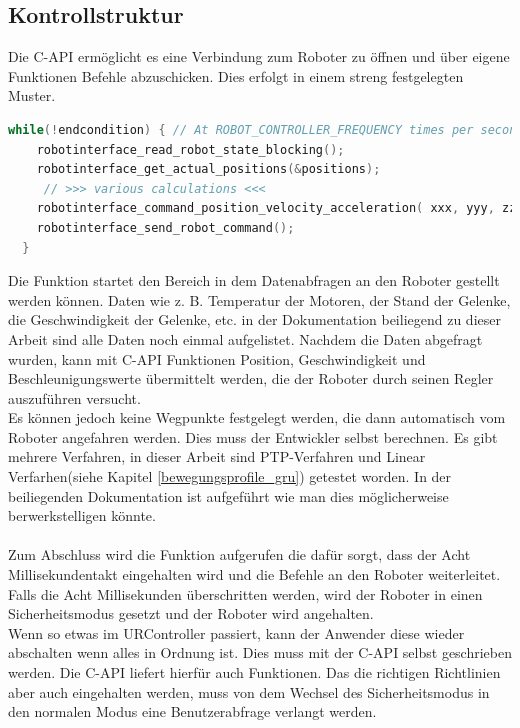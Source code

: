 \subsection{Kontrollstruktur}
\label{capi_control_loop_gru}	

Die C-\acs{API} ermöglicht es eine Verbindung zum Roboter zu öffnen und über eigene Funktionen Befehle abzuschicken. Dies erfolgt in einem streng festgelegten Muster.

\begin{lstlisting}[language=C,caption={Beispiel der Kontroll Struktur}, label=lst:robot_control_loop,captionpos=b]
  while(!endcondition) { // At ROBOT_CONTROLLER_FREQUENCY times per second
    robotinterface_read_robot_state_blocking();
    robotinterface_get_actual_positions(&positions);
     // >>> various calculations <<<
    robotinterface_command_position_velocity_acceleration( xxx, yyy, zzz);
    robotinterface_send_robot_command();
  }
\end{lstlisting}

Die Funktion  startet den Bereich in dem Datenabfragen an den Roboter gestellt werden können. Daten wie z. B. Temperatur der Motoren, der Stand der Gelenke, die Geschwindigkeit der Gelenke, etc. in der Dokumentation beiliegend zu dieser Arbeit sind alle Daten noch einmal aufgelistet. Nachdem die Daten abgefragt wurden, kann mit C-\acs{API} Funktionen Position, Geschwindigkeit und Beschleunigungswerte übermittelt werden, die der Roboter durch seinen Regler auszuführen versucht.\\
Es können jedoch keine Wegpunkte festgelegt werden, die dann automatisch vom Roboter angefahren werden. Dies muss der Entwickler selbst 
berechnen. 
Es gibt mehrere Verfahren, in dieser Arbeit sind \ac{PTP}-Verfahren und Linear Verfarhen(siehe Kapitel \ref{bewegungsprofile_gru}) getestet worden. In der beiliegenden Dokumentation ist aufgeführt wie man dies möglicherweise berwerkstelligen könnte.
\\\\
Zum Abschluss wird die Funktion  aufgerufen die dafür sorgt, dass der Acht Millisekundentakt eingehalten wird und die Befehle an den Roboter weiterleitet. Falls die Acht Millisekunden überschritten werden, wird der Roboter in einen Sicherheitsmodus gesetzt und der Roboter wird angehalten.
\\
Wenn so etwas im URController passiert, kann der Anwender diese wieder abschalten wenn alles in Ordnung ist. Dies muss mit der C-\acs{API} selbst geschrieben werden. Die C-\acs{API} liefert hierfür auch Funktionen. Das die richtigen Richtlinien aber auch eingehalten werden, muss von dem Wechsel des Sicherheitsmodus in den normalen Modus eine Benutzerabfrage verlangt werden.

